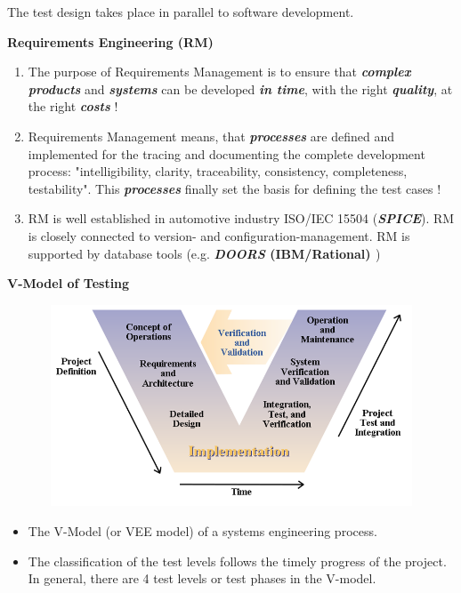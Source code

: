 The test design takes place in parallel to software development.\\

\os{\newpage}

{\rot\bf Requirements Engineering (RM)}

\begin{enumerate}
\item \textbf{ }The purpose of Requirements Management is to ensure that \textbf{\textit{complex products}} and \textbf{\textit{systems}} can be developed \textbf{\textit{in time}}, with the right \textbf{\textit{quality}}, at the right \textbf{\textit{costs}} !
\item  Requirements Management means, that \textbf{\textit{processes}} are defined and implemented for the tracing and documenting the complete development process: "intelligibility, clarity, traceability, consistency, completeness, testability". This \textbf{\textit{processes}} finally set the basis for defining the test cases !
\item  RM is well established in automotive industry  ISO/IEC 15504 (\textbf{\textit{SPICE}}). RM is closely connected to version- and configuration-management. RM is supported by database tools (e.g. \textbf{\textit{DOORS }(IBM/Rational)\textit{ }})
\end{enumerate}

\os{\newpage}

{\rot\bf V-Model of Testing}\\

    \begin{figure}[h]
    \centering
    \includegraphics[width=12cm, height=6cm]{Images/image58.png}
    \label{fig:Fig 155}
    \end{figure}

\begin{itemize}
	\item The V-Model (or VEE model) of a systems engineering process.
	\item The classification of the test levels follows the timely progress of the project. In general, there are 4 test levels or test phases in the V-model.
\end{itemize}

